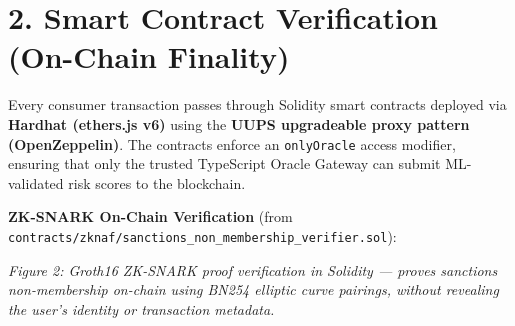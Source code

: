 \documentclass[11pt,a4paper]{article}
\begin{document}
\section*{2. Smart Contract Verification (On-Chain Finality)}
Every consumer transaction passes through Solidity smart contracts deployed via \textbf{Hardhat (ethers.js v6)} using the \textbf{UUPS upgradeable proxy pattern (OpenZeppelin)}. The contracts enforce an \texttt{onlyOracle} access modifier, ensuring that only the trusted TypeScript Oracle Gateway can submit ML-validated risk scores to the blockchain.

\vspace{0.3cm}
\noindent\textbf{ZK-SNARK On-Chain Verification} (from \texttt{contracts/zknaf/sanctions\_non\_membership\_verifier.sol}):

\vspace{0.2cm}
\noindent{}
\vspace{0.2cm}

\noindent\textit{Figure 2: Groth16 ZK-SNARK proof verification in Solidity --- proves sanctions non-membership on-chain using BN254 elliptic curve pairings, without revealing the user's identity or transaction metadata.}
\end{document}
